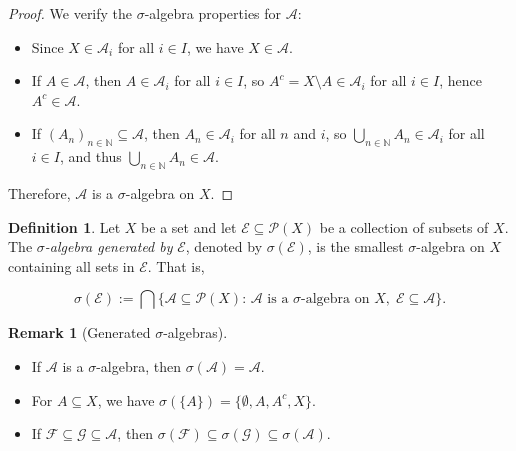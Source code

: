 \documentclass[12pt]{article}
\theoremstyle{definition}
\newtheorem{definition}{Definition}[section]
\newtheorem{remark}{Remark}[section]
\begin{document}
\begin{proof}
We verify the $\sigma$-algebra properties for $\mathcal{A}$:
\begin{itemize}
    \item Since $X \in \mathcal{A}_i$ for all $i \in I$, we have $X \in \mathcal{A}$.
    \item If $A \in \mathcal{A}$, then $A \in \mathcal{A}_i$ for all $i \in I$, so \( A^c = X \setminus A \in \mathcal{A}_i \) for all \( i \in I \), hence \( A^c \in \mathcal{A} \).
    \item If \( (A_n)_{n \in \mathbb{N}} \subseteq \mathcal{A} \), then \( A_n \in \mathcal{A}_i \) for all \( n \) and \( i \), so \( \bigcup_{n \in \mathbb{N}} A_n \in \mathcal{A}_i \) for all \( i \in I \), and thus \( \bigcup_{n \in \mathbb{N}} A_n \in \mathcal{A} \).
\end{itemize}
Therefore, $\mathcal{A}$ is a $\sigma$-algebra on $X$.
\end{proof}


\medskip
\begin{definition}
Let $X$ be a set and let $\mathcal{E} \subseteq \mathcal{P}(X)$ be a collection of subsets of $X$. The \textit{$\sigma$-algebra generated by} $\mathcal{E}$, denoted by $\sigma(\mathcal{E})$, is the smallest $\sigma$-algebra on $X$ containing all sets in $\mathcal{E}$. That is,

\[
\sigma(\mathcal{E}) := \bigcap \big\{ \mathcal{A} \subseteq \mathcal{P}(X) :\, \mathcal{A} \text{ is a } \sigma\text{-algebra on } X, \; \mathcal{E} \subseteq \mathcal{A} \big\}.
\]
\end{definition}


\medskip
\begin{remark}[Generated $\sigma$-algebras]
\leavevmode
\begin{itemize}
    \item If $\mathcal{A}$ is a $\sigma$-algebra, then $\sigma(\mathcal{A}) = \mathcal{A}$.
    \item For $A \subseteq X$, we have $\sigma(\{A\}) = \{\emptyset, A, A^c, X\}$.
    \item If $\mathcal{F} \subseteq \mathcal{G} \subseteq \mathcal{A}$, then $\sigma(\mathcal{F}) \subseteq \sigma(\mathcal{G}) \subseteq \sigma(\mathcal{A})$.
\end{itemize}
\end{remark}
\end{document}
